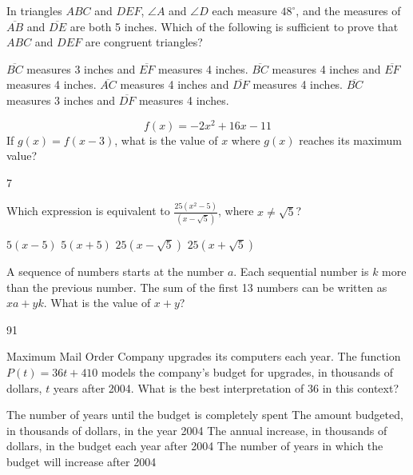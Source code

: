 \newpage





\question[1]
In triangles $ABC$ and $DEF$, $\angle A$ and $\angle D$ each measure $48^\circ$, and the measures of $\overline{AB}$ and $\overline{DE}$ are both 5 inches. Which of the following is sufficient to prove that $ABC$ and $DEF$ are congruent triangles?
\begin{choices}
  \choice $\overline{BC}$ measures 3 inches and $\overline{EF}$ measures 4 inches.
  \choice $\overline{BC}$ measures 4 inches and $\overline{EF}$ measures 4 inches.
  \CorrectChoice $\overline{AC}$ measures 4 inches and $\overline{DF}$ measures 4 inches.
  \choice $\overline{BC}$ measures 3 inches and $\overline{DF}$ measures 4 inches.
\end{choices}

\question[1]
\[
  f(x) = -2x^2 + 16x - 11
\]
If $g(x) = f(x - 3)$, what is the value of $x$ where $g(x)$ reaches its maximum value?
\begin{solution}
7
\end{solution}





\newpage



\question[1]
Which expression is equivalent to $\frac{25(x^2 - 5)}{(x - \sqrt{5})}$, where $x \neq \sqrt{5}$?
\begin{choices}
  \choice $5(x - 5)$
  \choice $5(x + 5)$
  \choice $25(x - \sqrt{5})$
  \CorrectChoice $25(x + \sqrt{5})$
\end{choices}

\question[1]
A sequence of numbers starts at the number $a$. Each sequential number is $k$ more than the previous number. The sum of the first 13 numbers can be written as $xa + yk$. What is the value of $x + y$?
\begin{solution}
91
\end{solution}

\question[1]
Maximum Mail Order Company upgrades its computers each year. The function $P(t)=36 t+410$ models the company's budget for upgrades, in thousands of dollars, $t$ years after 2004. What is the best interpretation of 36 in this context?
\begin{choices}
  \choice The number of years until the budget is completely spent
  \choice The amount budgeted, in thousands of dollars, in the year 2004
  \CorrectChoice The annual increase, in thousands of dollars, in the budget each year after 2004
  \choice The number of years in which the budget will increase after 2004
\end{choices}




